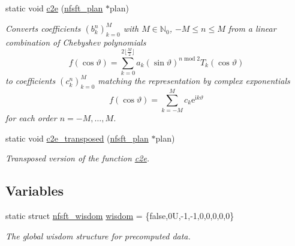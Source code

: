 \begin{CompactItemize}
static void \hyperlink{group__nfsft_g47209b28b6561fca7349ed8afa5f9656}{c2e} (\hyperlink{structnfsft__plan}{nfsft\_\-plan} $\ast$plan)
\begin{CompactList}\small\item\em Converts coefficients $\left(b_k^n\right)_{k=0}^M$ with $M \in \mathbb{N}_0$, $-M \le n \le M$ from a linear combination of Chebyshev polynomials \[ f(\cos\vartheta) = \sum_{k=0}^{2\lfloor\frac{M}{2}\rfloor} a_k (\sin\vartheta)^{n\;\mathrm{mod}\;2} T_k(\cos\vartheta) \] to coefficients $\left(c_k^n\right)_{k=0}^M$ matching the representation by complex exponentials \[ f(\cos\vartheta) = \sum_{k=-M}^{M} c_k \mathrm{e}^{\mathrm{i}k\vartheta} \] for each order $n=-M,\ldots,M$. \item\end{CompactList}\item 
static void \hyperlink{group__nfsft_g0e033457136bc0ecb18bb57d3ee5aa37}{c2e\_\-transposed} (\hyperlink{structnfsft__plan}{nfsft\_\-plan} $\ast$plan)
\begin{CompactList}\small\item\em Transposed version of the function \hyperlink{group__nfsft_g47209b28b6561fca7349ed8afa5f9656}{c2e}. \item\end{CompactList}\end{CompactItemize}
\subsection*{Variables}
\begin{CompactItemize}
\item 
static struct \hyperlink{structnfsft__wisdom}{nfsft\_\-wisdom} \hyperlink{group__nfsft_g0af81d81e1b436949ddc46dbd27346e5}{wisdom} = \{false,0U,-1,-1,0,0,0,0,0\}
\begin{CompactList}\small\item\em The global wisdom structure for precomputed data. \item\end{CompactList}\end{CompactItemize}


